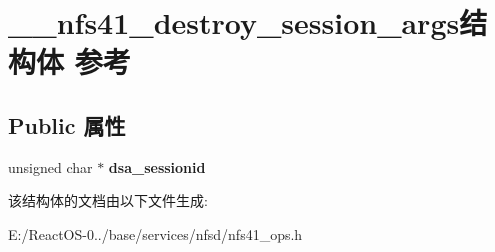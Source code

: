 \hypertarget{struct____nfs41__destroy__session__args}{}\section{\+\_\+\+\_\+nfs41\+\_\+destroy\+\_\+session\+\_\+args结构体 参考}
\label{struct____nfs41__destroy__session__args}
\subsection*{Public 属性}
\begin{DoxyCompactItemize}
\item 
\mbox{\label{struct____nfs41__destroy__session__args_a14da3e2203a7e23f70bf66912f9e00b6}} 
unsigned char $\ast$ {\bfseries dsa\+\_\+sessionid}
\end{DoxyCompactItemize}


该结构体的文档由以下文件生成\+:\begin{DoxyCompactItemize}
\item 
E\+:/\+React\+O\+S-\/0../base/services/nfsd/nfs41\+\_\+ops.\+h\end{DoxyCompactItemize}
